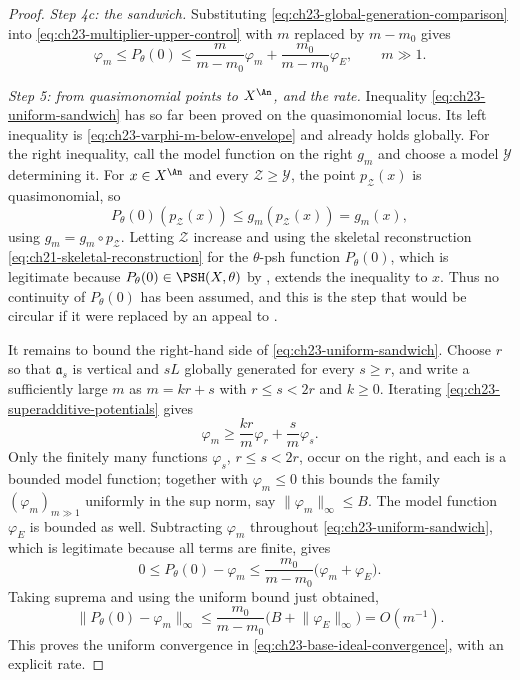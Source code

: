 \begin{proof}
\emph{Step 4c: the sandwich.}
Substituting \eqref{eq:ch23-global-generation-comparison} into
\eqref{eq:ch23-multiplier-upper-control} with \(m\) replaced by \(m-m_0\)
gives
\begin{equation}\label{eq:ch23-uniform-sandwich}
 \varphi_m
 \leq P_\theta(0)
 \leq
 \frac{m}{m-m_0}\varphi_m
 +\frac{m_0}{m-m_0}\varphi_E,
 \qquad m\gg1 .
\end{equation}

\emph{Step 5: from quasimonomial points to \(X^{\An}\), and the rate.}
Inequality \eqref{eq:ch23-uniform-sandwich} has so far been proved on the
quasimonomial locus.  Its left inequality is
\eqref{eq:ch23-varphi-m-below-envelope} and already holds globally.  For the
right inequality, call the model function on the right \(g_m\) and choose a
model \(\mathcal Y\) determining it.  For \(x\in X^{\An}\) and every
\(\mathcal Z\geq\mathcal Y\), the point \(p_{\mathcal Z}(x)\) is
quasimonomial, so
\[
       P_\theta(0)(p_{\mathcal Z}(x))
       \leq g_m(p_{\mathcal Z}(x))=g_m(x),
\]
using \(g_m=g_m\circ p_{\mathcal Z}\).  Letting \(\mathcal Z\) increase and
using the skeletal reconstruction
\eqref{eq:ch21-skeletal-reconstruction} for the \(\theta\)-psh function
\(P_\theta(0)\), which is legitimate because \(P_\theta(0)\in\PSH(X,\theta)\)
by , extends the inequality to \(x\).
Thus no continuity of \(P_\theta(0)\) has been assumed, and this is the
step that would be circular if it were replaced by an appeal to
.

It remains to bound the right-hand side of
\eqref{eq:ch23-uniform-sandwich}.  Choose \(r\) so that \(\mathfrak a_s\) is
vertical and \(sL\) globally generated for every \(s\geq r\), and write a
sufficiently large \(m\) as \(m=kr+s\) with \(r\leq s<2r\) and
\(k\geq0\).  Iterating \eqref{eq:ch23-superadditive-potentials} gives
\[
 \varphi_m
 \geq\frac{kr}{m}\varphi_r+\frac{s}{m}\varphi_s .
\]
Only the finitely many functions \(\varphi_s\), \(r\leq s<2r\), occur on the
right, and each is a bounded model function; together with
\(\varphi_m\leq0\) this bounds the family \((\varphi_m)_{m\gg1}\) uniformly
in the sup norm, say \(\|\varphi_m\|_\infty\leq B\).  The model function
\(\varphi_E\) is bounded as well.  Subtracting \(\varphi_m\) throughout
\eqref{eq:ch23-uniform-sandwich}, which is legitimate because all terms are
finite, gives
\begin{equation}\label{eq:ch23-sandwich-difference}
 0\leq P_\theta(0)-\varphi_m
 \leq\frac{m_0}{m-m_0}
          \bigl(\varphi_m+\varphi_E\bigr) .
\end{equation}
Taking suprema and using the uniform bound just obtained,
\begin{equation}\label{eq:ch23-envelope-rate}
 \lVert P_\theta(0)-\varphi_m\rVert_\infty
 \leq \frac{m_0}{m-m_0}
 \bigl(B+\lVert\varphi_E\rVert_\infty\bigr)
 =O(m^{-1}).
\end{equation}
This proves the uniform convergence in
\eqref{eq:ch23-base-ideal-convergence}, with an explicit rate.


\end{proof}
